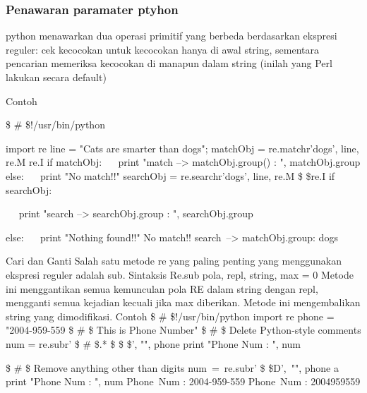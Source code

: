 \subsubsection{Penawaran paramater ptyhon}
python menawarkan dua operasi primitif yang berbeda berdasarkan ekspresi reguler: cek kecocokan untuk kecocokan hanya di awal string, sementara pencarian memeriksa kecocokan di manapun dalam string (inilah yang Perl lakukan secara default)

Contoh 

 \$  \#  \$!/usr/bin/python \par
import re 
line = "Cats are smarter than dogs"; 
matchObj = re.match{r'dogs', line, re.M  \vert  re.I}  
if matchObj: 
~~ print "match --> matchObj.group() : ", matchObj.group{} 
else: 
~~ print "No match!!" 
searchObj = re.search{r'dogs', line, re.M \$  \vert  \$re.I} 
if searchObj: 
\item
~~ print "search --> searchObj.group{} : ", searchObj.group{} 
\item
else: 
~~ print "Nothing found!!" 
No match!!
search~--> matchObj.group{}:  dogs 
\item
Cari dan Ganti 
Salah satu metode re yang paling penting yang menggunakan ekspresi reguler adalah sub.  
Sintaksis 
Re.sub {pola, repl, string, max = 0} 
Metode ini menggantikan semua kemunculan pola RE dalam string dengan repl, mengganti semua kejadian kecuali jika max diberikan. Metode ini mengembalikan string yang dimodifikasi. 
Contoh 
 \$  \#  \$!/usr/bin/python 
import re 
phone = "2004-959-559  \$  \#  \$ This is Phone Number" 
 \$  \#  \$ Delete Python-style comments 
num = re.sub{r' \$  \#  \$.* \$  \$  \$', "", phone} 
print "Phone Num : ", num 
\item
 \$  \#  \$ Remove anything other than digits 
num~=~re.sub{r' \$  \setminus  \$D',~"", phone}     a
print "Phone Num : ", num  
Phone~Num :  2004-959-559 
Phone~Num :  2004959559 
